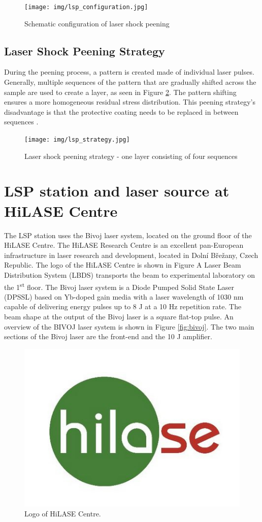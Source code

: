 \begin{figure}[h]
    \centering
    \texttt{[image: img/lsp\_configuration.jpg]}
    \caption{Schematic configuration of laser shock peening}
    \label{fig:lspconfiguration}
\end{figure}

\subsection{Laser Shock Peening Strategy}
During the peening process, a pattern is created made of individual laser pulses. Generally, multiple sequences of the pattern that are gradually shifted across the sample are used to create a layer, as seen in Figure \ref{fig:lspstrategy}. The pattern shifting ensures a more homogeneous residual stress distribution. This peening strategy's disadvantage is that the protective coating needs to be replaced in between sequences \cite{kaufman}.

\begin{figure}[h]
    \centering
    \texttt{[image: img/lsp\_strategy.jpg]}
    \caption{Laser shock peening strategy - one layer consisting of four sequences}
    \label{fig:lspstrategy}
\end{figure}

\section{LSP station and laser source at HiLASE Centre}

The LSP station uses the Bivoj laser system, located on the ground floor of the HiLASE Centre. The HiLASE Research Centre is an excellent pan-European infrastructure in laser research and development, located in Dolní Břežany, Czech Republic. The logo of the HiLASE Centre is shown in Figure A Laser Beam Distribution System (LBDS) transports the beam to
experimental laboratory on the 1\textsuperscript{st} floor. The Bivoj laser system is a Diode Pumped Solid State Laser (DPSSL) based on Yb-doped gain media with a laser wavelength of 1030 nm capable of delivering energy pulses up to 8 J at a 10 Hz repetition rate. The beam shape at the output of the Bivoj laser is a square flat-top pulse. An overview of the BIVOJ laser system is shown in Figure \ref{fig:bivoj}. The two main sections of the Bivoj laser are the front-end and the 10 J amplifier.



\begin{figure}[h]
    \centering
    \includegraphics[width=0.6\linewidth]{img/hilase.jpg}
    \caption{Logo of HiLASE Centre.}
    \label{fig:lspconfiguration}
\end{figure}

